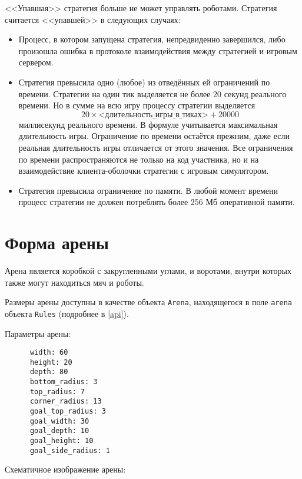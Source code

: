 <<Упавшая>> стратегия больше не может управлять роботами. Стратегия считается <<упавшей>> в следующих случаях:
\begin{itemize}
      \item Процесс, в котором запущена стратегия, непредвиденно завершился,
            либо произошла ошибка в протоколе взаимодействия между стратегией и игровым сервером.
      \item Стратегия превысила одно (любое) из отведённых ей ограничений по времени.
            Стратегии на один тик выделяется не более $20$ секунд реального времени.
            Но в сумме на всю игру процессу стратегии выделяется
	      \begin{equation}
		      20\times\textit{<длительность\_игры\_в\_тиках>}+20000
	      \end{equation}
	      миллисекунд реального времени.
            В формуле учитывается максимальная длительность игры.
            Ограничение по времени остаётся прежним, даже если реальная длительность игры отличается от этого значения.
            Все ограничения по времени распространяются не только на код участника,
            но и на взаимодействие клиента-оболочки стратегии с игровым симулятором.
      \item Стратегия превысила ограничение по памяти.
            В любой момент времени процесс стратегии не должен потреблять более 256 Мб оперативной памяти.
\end{itemize}

\section{Форма арены}\label{arena_form}

Арена является коробкой с закругленными углами, и воротами, внутри которых также могут находиться мяч и роботы.

Размеры арены доступны в качестве объекта \texttt{Arena}, находящегося в поле \texttt{arena} объекта \texttt{Rules} (подробнее в \ref{api}).

Параметры арены:

\begin{verbatim}
      width: 60
      height: 20
      depth: 80
      bottom_radius: 3
      top_radius: 7
      corner_radius: 13
      goal_top_radius: 3
      goal_width: 30
      goal_depth: 10
      goal_height: 10
      goal_side_radius: 1
\end{verbatim}

Схематичное изображение арены:

